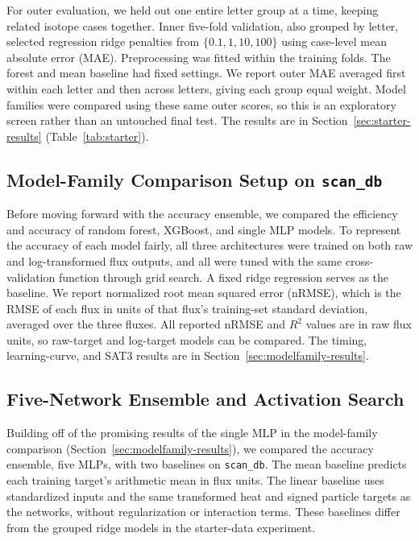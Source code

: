 \documentclass[12pt,letterpaper]{article}
\begin{document}
For outer evaluation, we held out one entire letter group at a time, keeping
related isotope cases together. Inner five-fold validation, also grouped by
letter, selected regression ridge penalties from $\{0.1,1,10,100\}$ using
case-level mean absolute error (MAE). Preprocessing was fitted within the
training folds. The forest and mean baseline had fixed settings. We report
outer MAE averaged first within each letter and then across letters, giving
each group equal weight. Model families were compared using these same outer
scores, so this is an exploratory screen rather than an untouched final test.
The results are in Section~\ref{sec:starter-results} (Table~\ref{tab:starter}).

\subsection{Model-Family Comparison Setup on \texttt{scan\_db}}
\label{sec:modelfamily-setup}

Before moving forward with the accuracy ensemble, we compared the efficiency
and accuracy of random forest, XGBoost, and single MLP models. To represent the
accuracy of each model fairly, all three architectures were trained on both raw
and log-transformed flux outputs, and all were tuned with the same
cross-validation function through grid search. A fixed ridge regression serves
as the baseline. We report normalized root mean squared error (nRMSE), which is the RMSE of each
flux in units of that flux's training-set standard deviation, averaged over
the three fluxes. All reported nRMSE and $R^2$ values are in raw flux units, so
raw-target and log-target models can be compared. The timing, learning-curve,
and SAT3 results are in Section~\ref{sec:modelfamily-results}.

\subsection{Five-Network Ensemble and Activation Search}
\label{sec:ensemble-methods}

Building off of the promising results of the single MLP in the model-family
comparison (Section~\ref{sec:modelfamily-results}), we compared the accuracy ensemble, five MLPs, with two baselines on \texttt{scan\_db}.
The mean baseline predicts each training target's arithmetic mean in flux
units. The linear baseline uses standardized inputs and the same transformed
heat and signed particle targets as the networks, without regularization or
interaction terms. These baselines differ from the grouped ridge models in
the starter-data experiment.
\end{document}
